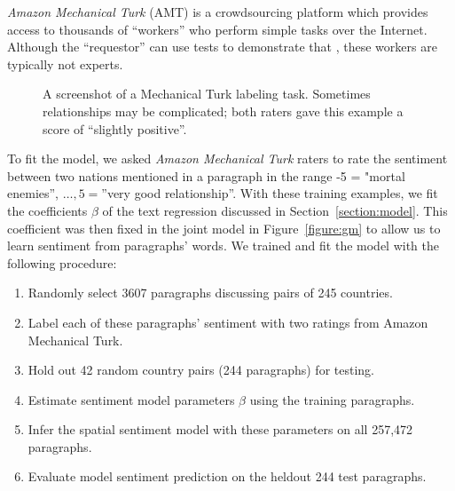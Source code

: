 \emph{Amazon Mechanical Turk} (AMT) is a crowdsourcing platform which
provides access to thousands of ``workers'' who perform simple tasks
over the Internet.  Although the ``requestor'' can use tests to
demonstrate that , these workers are typically not experts.

\begin{figure}
  \setlength\fboxsep{0pt}
  \setlength\fboxrule{0.5pt}
  \center {}
  \label{figure:mechanical_turk_sample}
  \small\caption{A screenshot of a Mechanical Turk labeling task.
    Sometimes relationships may be complicated; both raters gave this
    example a score of ``slightly positive''.}
  \normalsize
\end{figure}

To fit the model, we asked \emph{Amazon Mechanical Turk} raters to rate the
sentiment between two nations mentioned in a paragraph in the range -5
= "mortal enemies'', $\ldots, 5 = $''very good relationship''.
With these training examples, we fit the coefficients $\beta$ of the
text regression discussed in Section~\ref{section:model}.  This
coefficient was then fixed in the joint model in
Figure~\ref{figure:gm} to allow us to learn sentiment from
paragraphs' words.  We trained and fit the model with the following procedure:

\begin{enumerate}
  \item Randomly select 3607 paragraphs discussing pairs of 245 countries.
  \item Label each of these paragraphs' sentiment with two ratings
    from Amazon Mechanical Turk.
  \item Hold out 42 random country pairs (244 paragraphs) for testing.
  \item Estimate sentiment model parameters $\beta$ using the training
    paragraphs.
  \item Infer the spatial sentiment model with these parameters on
    all 257,472 paragraphs.
  \item Evaluate model sentiment prediction on the heldout 244 test
    paragraphs.
\end{enumerate}

